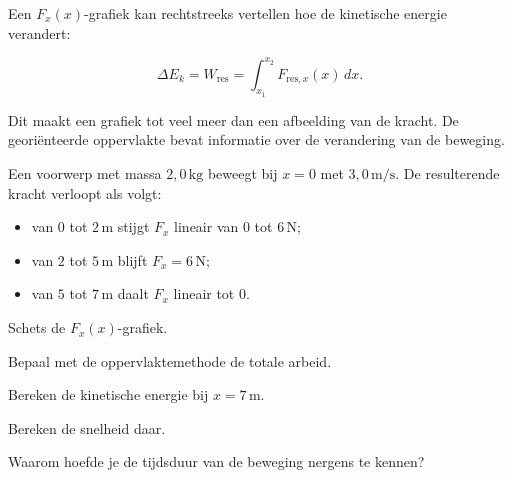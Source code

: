 \documentclass{ximera}
\begin{document}

Een $F_x(x)$-grafiek kan rechtstreeks vertellen hoe de kinetische energie
verandert:

\[
\Delta E_k
=
W_{\mathrm{res}}
=
\int_{x_1}^{x_2}F_{\mathrm{res},x}(x)\,dx.
\]

Dit maakt een grafiek tot veel meer dan een afbeelding van de kracht. De
georiënteerde oppervlakte bevat informatie over de verandering van de
beweging.


\begin{oefening}{\oefU\ESS}

Een voorwerp met massa $2{,}0\,\mathrm{kg}$ beweegt bij $x=0$ met
$3{,}0\,\mathrm{m/s}$. De resulterende kracht verloopt als volgt:

\begin{itemize}
  \item van $0$ tot $2\,\mathrm m$ stijgt $F_x$ lineair van $0$ tot
        $6\,\mathrm N$;
  \item van $2$ tot $5\,\mathrm m$ blijft $F_x=6\,\mathrm N$;
  \item van $5$ tot $7\,\mathrm m$ daalt $F_x$ lineair tot $0$.
\end{itemize}

\begin{question}
Schets de $F_x(x)$-grafiek.
\end{question}

\begin{question}
Bepaal met de oppervlaktemethode de totale arbeid.
\end{question}

\begin{question}
Bereken de kinetische energie bij $x=7\,\mathrm m$.
\end{question}

\begin{question}
Bereken de snelheid daar.
\end{question}

\begin{question}
Waarom hoefde je de tijdsduur van de beweging nergens te kennen?
\end{question}

\end{oefening}
\end{document}
